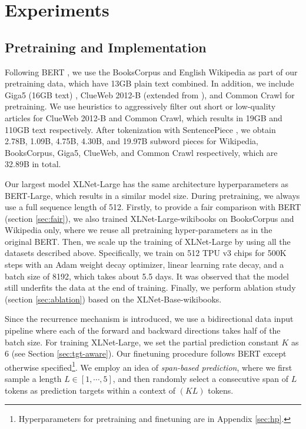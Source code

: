 \section{Experiments} \label{sec:exp}


\subsection{Pretraining and Implementation}
\label{sec:implementation}

Following BERT \cite{devlin2018bert}, we use the BooksCorpus \cite{zhu2015aligning} and English Wikipedia as part of our pretraining data, which have 13GB plain text combined. In addition, we include Giga5 (16GB text) \cite{parker2011english}, ClueWeb 2012-B (extended from \cite{callan2009clueweb09}), and Common Crawl \cite{crawlcommon} for pretraining. We use heuristics to aggressively filter out short or low-quality articles for ClueWeb 2012-B and Common Crawl, which results in 19GB and 110GB text respectively. After tokenization with SentencePiece \cite{kudo2018sentencepiece}, we obtain 2.78B, 1.09B, 4.75B, 4.30B, and 19.97B subword pieces for Wikipedia, BooksCorpus, Giga5, ClueWeb, and Common Crawl respectively, which are 32.89B in total. 

Our largest model XLNet-Large has the same architecture hyperparameters as BERT-Large, which results in a similar model size.
During pretraining, we always use a full sequence length of 512.
Firstly, to provide a fair comparison with BERT (section \ref{sec:fair}), we also trained XLNet-Large-wikibooks on BooksCorpus and Wikipedia only, where we reuse all pretraining hyper-parameters as in the original BERT.
Then, we scale up the training of XLNet-Large by using all the datasets described above.
Specifically, we train on 512 TPU v3 chips for 500K steps with an Adam weight decay optimizer, linear learning rate decay, and a batch size of 8192, which takes about 5.5 days. 
It was observed that the model still underfits the data at the end of training.
Finally, we perform ablation study (section \ref{sec:ablation}) based on the XLNet-Base-wikibooks.


Since the recurrence mechanism is introduced, we use a bidirectional data input pipeline where each of the forward and backward directions takes half of the batch size. 
For training XLNet-Large, we set the partial prediction constant $K$ as 6 (see Section \ref{sec:tgt-aware}).
Our finetuning procedure follows BERT \cite{devlin2018bert} except otherwise specified\footnote{Hyperparameters for pretraining and finetuning are in Appendix \ref{sec:hp}.}.
We employ an idea of \textit{span-based prediction}, where we first sample a length $L \in [1, \cdots, 5]$, and then randomly select a consecutive span of $L$ tokens as prediction targets within a context of $(K L)$ tokens.

